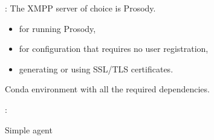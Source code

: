 \begin{frame}{\insertsection: \insertsubsection}
    \onslide<+->
    The \ac{XMPP} server of choice is Prosody.
    \hfill\href{https://prosody.im}{\faExternalLink}

    \begin{itemize}
        \item {} for running Prosody,
        \hfill\href{https://prosody.im}{\faExternalLink}

        \item {} for configuration that requires no user registration,
        \hfill\href{https://prosody.im}{\faExternalLink}

        \item generating or using SSL/TLS certificates.
        \hfill\href{https://prosody.im/doc/certificates}{\faExternalLink}
    \end{itemize}

    \bigskip
    Conda environment with all the required dependencies.
    \hfill\href{https://github.com/AILab-FOI/MAGO/blob/main/Deliverables/Phase\%201/Implementation/env.yml}{\faExternalLink}
\end{frame}

\begin{frame}[fragile]{\insertsection: \insertsubsection}
    \begin{listing}
    \caption{Simple agent}
    \end{listing}
\end{frame}




\begin{frame}{\insertsection}
\end{frame}

